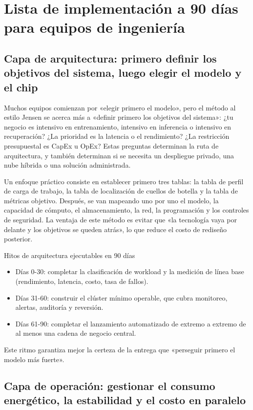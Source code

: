 \section{Lista de implementación a 90 días para equipos de ingeniería}

\subsection{Capa de arquitectura: primero definir los objetivos del sistema, luego elegir el modelo y el chip}

Muchos equipos comienzan por «elegir primero el modelo», pero el método al estilo Jensen se acerca más a «definir primero los objetivos del sistema»: ¿tu negocio es intensivo en entrenamiento, intensivo en inferencia o intensivo en recuperación? ¿La prioridad es la latencia o el rendimiento? ¿La restricción presupuestal es CapEx u OpEx? Estas preguntas determinan la ruta de arquitectura, y también determinan si se necesita un despliegue privado, una nube híbrida o una solución administrada.

Un enfoque práctico consiste en establecer primero tres tablas: la tabla de perfil de carga de trabajo, la tabla de localización de cuellos de botella y la tabla de métricas objetivo. Después, se van mapeando uno por uno el modelo, la capacidad de cómputo, el almacenamiento, la red, la programación y los controles de seguridad. La ventaja de este método es evitar que «la tecnología vaya por delante y los objetivos se queden atrás», lo que reduce el costo de rediseño posterior.

\begin{importantbox}{Hitos de arquitectura ejecutables en 90 días}
\begin{itemize}
    \item Días 0-30: completar la clasificación de workload y la medición de línea base (rendimiento, latencia, costo, tasa de fallos).
    \item Días 31-60: construir el clúster mínimo operable, que cubra monitoreo, alertas, auditoría y reversión.
    \item Días 61-90: completar el lanzamiento automatizado de extremo a extremo de al menos una cadena de negocio central.
\end{itemize}
Este ritmo garantiza mejor la certeza de la entrega que «perseguir primero el modelo más fuerte».
\end{importantbox}

\subsection{Capa de operación: gestionar el consumo energético, la estabilidad y el costo en paralelo}

